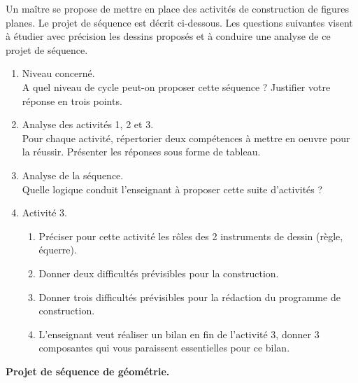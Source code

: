 \begin{exercice}
Un maître se propose de mettre en place des activités de construction de figures planes. Le projet de séquence est décrit ci-dessous. Les questions suivantes visent à étudier avec précision les dessins proposés et à conduire une analyse de ce projet de séquence.
\begin{enumerate}
   \item Niveau concerné. \\
   A quel niveau de cycle peut-on proposer cette séquence ? Justifier votre réponse en trois points.
   \item Analyse des activités 1, 2 et 3. \\
   Pour chaque activité, répertorier deux compétences à mettre en oeuvre pour la réussir. Présenter les réponses sous forme de tableau.
   \item Analyse de la séquence. \\
   Quelle logique conduit l'enseignant à proposer cette suite d'activités ?
   \item Activité 3.
   \begin{enumerate}
      \item Préciser pour cette activité les rôles des 2 instruments de dessin (règle, équerre).
      \item Donner deux difficultés prévisibles pour la construction.
      \item Donner trois difficultés prévisibles pour la rédaction du programme de construction.
      \item L'enseignant veut réaliser un bilan en fin de l'activité 3, donner 3 composantes qui vous paraissent essentielles pour ce bilan. \\
   \end{enumerate}
\end{enumerate}

{\bf Projet de séquence de géométrie.}


\end{exercice}
